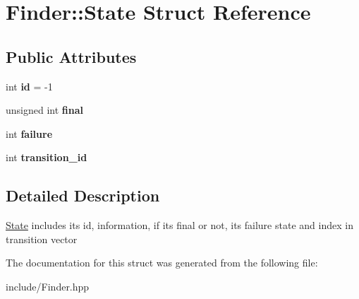 \hypertarget{structFinder_1_1State}{}\section{Finder\+:\+:State Struct Reference}
\label{structFinder_1_1State}
\subsection*{Public Attributes}
\begin{DoxyCompactItemize}
\item 
\mbox{\label{structFinder_1_1State_ad3fed943eb681e5ce2db7ac2abdaab07}} 
int {\bfseries id} = -\/1
\item 
\mbox{\label{structFinder_1_1State_a57a9090467316e5b9eed5309d4518df5}} 
unsigned int {\bfseries final}
\item 
\mbox{\label{structFinder_1_1State_af8eeac7d577d603edf2ff8b3141cfd15}} 
int {\bfseries failure}
\item 
\mbox{\label{structFinder_1_1State_a443b3bfb3fafc6f1a36a8203ba606a21}} 
int {\bfseries transition\+\_\+id}
\end{DoxyCompactItemize}


\subsection{Detailed Description}
\hyperlink{structFinder_1_1State}{State} includes its id, information, if its final or not, its failure state and index in transition vector 

The documentation for this struct was generated from the following file\+:\begin{DoxyCompactItemize}
\item 
include/Finder.\+hpp\end{DoxyCompactItemize}
